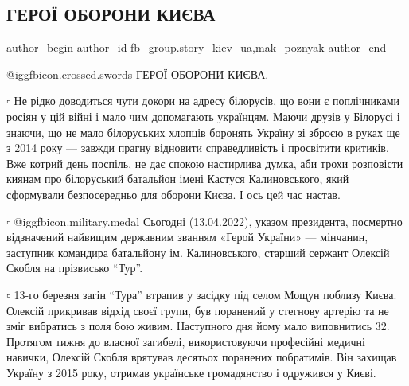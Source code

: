  
 
 
 
 
 
\subsection{ГЕРОЇ ОБОРОНИ КИЄВА}
\label{sec:13_04_2022.fb.fb_group.story_kiev_ua.1.geroi_oborony_kieva}
 
\ifcmt
 author_begin
   author_id fb_group.story_kiev_ua,mak_poznyak
 author_end
\fi

@igg{fbicon.crossed.swords} ГЕРОЇ ОБОРОНИ КИЄВА.

▫️ Не рідко доводиться чути докори на адресу білорусів, що вони є поплічниками
росіян у цій війні і мало чим допомагають українцям. Маючи друзів у Білорусі і
знаючи, що не мало білоруських хлопців боронять Україну зі зброєю в руках ще з
2014 року — завжди прагну відновити справедливість і просвітити критиків. Вже
котрий день поспіль, не дає спокою настирлива думка, аби трохи розповісти
киянам про білоруський батальйон імені Кастуся Калиновського, який сформували
безпосередньо для оборони Києва. І ось цей час настав.


▫️ @igg{fbicon.military.medal}  Сьогодні (13.04.2022), указом президента, посмертно відзначений найвищим
державним званням «Герой України» — мінчанин, заступник командира батальйону
ім. Калиновського, старший сержант Олексій Скобля на прізвисько \enquote{Тур}.

▫️ 13-го березня загін \enquote{Тура} втрапив у засідку під селом Мощун поблизу Києва.
Олексій прикривав відхід своєї групи, був поранений у стегнову артерію та не
зміг вибратись з поля бою живим. Наступного дня йому мало виповнитись 32.
Протягом тижня до власної загибелі, використовуючи професійні медичні навички,
Олексій Скобля врятував десятьох поранених побратимів. Він захищав Україну з
2015 року, отримав українське громадянство і одружився у Києві.

